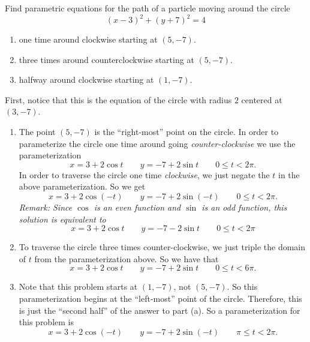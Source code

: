 \documentclass[noinstructornotes]{ximera}
\begin{document}
\begin{problem}
Find parametric equations for the path of a particle moving around the circle
	\[
	(x-3)^2 + (y+7)^2 = 4
	\]
	
	\begin{enumerate}
	\item  one time around clockwise starting at $(5,-7)$.  
	\item  three times around counterclockwise starting at $(5,-7)$.  
	\item  halfway around clockwise starting at $(1,-7)$.  
	\end{enumerate}
	
	\begin{freeResponse}
	First, notice that this is the equation of the circle with radius $2$ centered at $(3,-7)$.  
	\begin{enumerate}
	\item  The point $(5,-7)$ is the ``right-most'' point on the circle.  
	In order to parameterize the circle one time around going {\it counter-clockwise} we use the parameterization
		\[
		x = 3 + 2 \cos t 	\qquad 	y = -7 + 2 \sin t 	\qquad	0 \leq t < 2 \pi.
		\]
	In order to traverse the circle one time {\it clockwise}, we just negate the $t$ in the above parameterization.  
	So we get
		\[
		\boxed{x = 3 + 2 \cos(-t) 	\qquad	y = -7 + 2 \sin(-t) 	\qquad	0 \leq t < 2 \pi}.
		\]
	{\it Remark:  Since $\cos$ is an even function and $\sin$ is an odd function, this solution is equivalent to
		\[
		x = 3 + 2 \cos t 	\qquad	y = -7 - 2 \sin t 	\qquad	0 \leq t < 2 \pi
		\]
	}
	
	
	
	\item  To traverse the circle three times counter-clockwise, we just triple the domain of $t$ from the parameterization above.  
	So we have that
		\[
		\boxed{x = 3 + 2 \cos t 	\qquad 	y = -7 + 2 \sin t 	\qquad	0 \leq t < 6 \pi}.
		\]
	
	
	
	\item  Note that this problem starts at $(1,-7)$, not $(5,-7)$.  
	So this parameterization begins at the ``left-most'' point of the circle.  
	Therefore, this is just the ``second half'' of the answer to part (a).  
	So a parameterization for this problem is
		\[
		\boxed{x = 3 + 2 \cos(-t) 	\qquad	y = -7 + 2 \sin(-t) 	\qquad	\pi \leq t < 2 \pi}.
		\]
	
	\end{enumerate}
	\end{freeResponse}
		
\end{problem}
\end{document}
